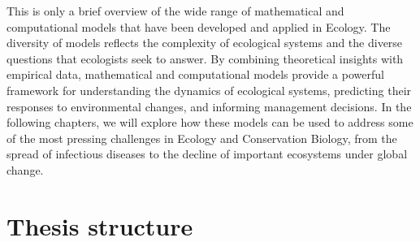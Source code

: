 This is only a brief overview of the wide range of mathematical and
computational models that have been developed and applied in Ecology. The
diversity of models reflects the complexity of ecological systems and the
diverse questions that ecologists seek to answer. By combining theoretical
insights with empirical data, mathematical and computational models provide a
powerful framework for understanding the dynamics of ecological systems,
predicting their responses to environmental changes, and informing management
decisions. In the following chapters, we will explore how these models can be
used to address some of the most pressing challenges in Ecology and
Conservation Biology, from the spread of infectious diseases to the decline of
important ecosystems under global change.

\section{\label{sec:Thesis structure} Thesis structure}

